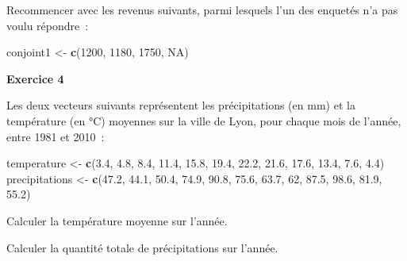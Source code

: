 \documentclass[12pt,]{book}
\newenvironment{Shaded}{\begin{snugshade}}{\end{snugshade}}
\newcommand{\DataTypeTok}[1]{\textcolor[rgb]{0.27,0.27,0.27}{#1}}
\newcommand{\DecValTok}[1]{\textcolor[rgb]{0.06,0.06,0.06}{#1}}
\newcommand{\FloatTok}[1]{\textcolor[rgb]{0.06,0.06,0.06}{#1}}
\newcommand{\KeywordTok}[1]{\textcolor[rgb]{0.27,0.27,0.27}{\textbf{#1}}}
\newcommand{\NormalTok}[1]{#1}
\newcommand{\OtherTok}[1]{\textcolor[rgb]{0.37,0.37,0.37}{#1}}
\newcommand{\StringTok}[1]{\textcolor[rgb]{0.5,0.5,0.5}{#1}}
\begin{document}
\fi

Recommencer avec les revenus suivants, parmi lesquels l'un des enquetés n'a pas voulu répondre~:

\begin{Shaded}
\begin{Highlighting}[]
\NormalTok{conjoint1 <-}\StringTok{ }\KeywordTok{c}\NormalTok{(}\DecValTok{1200}\NormalTok{, }\DecValTok{1180}\NormalTok{, }\DecValTok{1750}\NormalTok{, }\OtherTok{NA}\NormalTok{)}
\end{Highlighting}
\end{Shaded}

\textbf{Exercice 4}

Les deux vecteurs suivants représentent les précipitations (en mm) et la température (en °C) moyennes sur la ville de Lyon, pour chaque mois de l'année, entre 1981 et 2010~:

\begin{Shaded}
\begin{Highlighting}[]
\NormalTok{temperature <-}\StringTok{ }\KeywordTok{c}\NormalTok{(}\FloatTok{3.4}\NormalTok{, }\FloatTok{4.8}\NormalTok{, }\FloatTok{8.4}\NormalTok{, }\FloatTok{11.4}\NormalTok{, }\FloatTok{15.8}\NormalTok{, }\FloatTok{19.4}\NormalTok{, }\FloatTok{22.2}\NormalTok{, }\FloatTok{21.6}\NormalTok{, }\FloatTok{17.6}\NormalTok{, }\FloatTok{13.4}\NormalTok{, }\FloatTok{7.6}\NormalTok{, }\FloatTok{4.4}\NormalTok{)}
\NormalTok{precipitations <-}\StringTok{ }\KeywordTok{c}\NormalTok{(}\FloatTok{47.2}\NormalTok{, }\FloatTok{44.1}\NormalTok{, }\FloatTok{50.4}\NormalTok{, }\FloatTok{74.9}\NormalTok{, }\FloatTok{90.8}\NormalTok{, }\FloatTok{75.6}\NormalTok{, }\FloatTok{63.7}\NormalTok{, }\DecValTok{62}\NormalTok{, }\FloatTok{87.5}\NormalTok{, }\FloatTok{98.6}\NormalTok{, }\FloatTok{81.9}\NormalTok{, }\FloatTok{55.2}\NormalTok{)}
\end{Highlighting}
\end{Shaded}

Calculer la température moyenne sur l'année.

Calculer la quantité totale de précipitations sur l'année.
\end{document}

